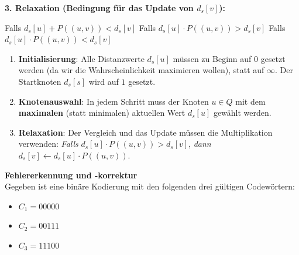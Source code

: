 \begin{questions}
    \textbf{3. Relaxation (Bedingung für das Update von $d_s[v]$):}
    \begin{checkboxes}
        \choice Falls $d_s[u] + P((u, v)) < d_s[v]$
        \CorrectChoice Falls $d_s[u] \cdot P((u, v)) > d_s[v]$
        \choice Falls $d_s[u] \cdot P((u, v)) < d_s[v]$
    \end{checkboxes}
\begin{solution}
    \begin{enumerate}
        \item \textbf{Initialisierung}: Alle Distanzwerte $d_s[u]$ müssen zu Beginn auf $0$ gesetzt werden (da wir die Wahrscheinlichkeit maximieren wollen), statt auf $\infty$. Der Startknoten $d_s[s]$ wird auf $1$ gesetzt.
        \item \textbf{Knotenauswahl}: In jedem Schritt muss der Knoten $u \in Q$ mit dem \textbf{maximalen} (statt minimalen) aktuellen Wert $d_s[u]$ gewählt werden.
        \item \textbf{Relaxation}: Der Vergleich und das Update müssen die Multiplikation verwenden: 
        \textit{Falls} $d_s[u] \cdot P((u, v)) > d_s[v]$, \textit{dann} $d_s[v] \leftarrow d_s[u] \cdot P((u, v))$.
    \end{enumerate}
\end{solution}
\question \textbf{Fehlererkennung und -korrektur} \\
Gegeben ist eine binäre Kodierung mit den folgenden drei gültigen Codewörtern:
\begin{itemize}
    \item $C_1 = 00000$
    \item $C_2 = 00111$
    \item $C_3 = 11100$
\end{itemize}
\begin{solution}

\end{solution}
\end{questions}
